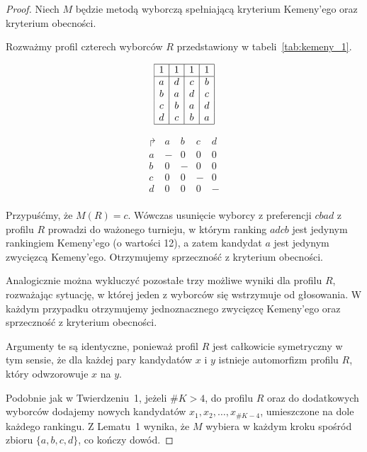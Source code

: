 \documentclass[12pt,a4paper]{mwrep}
\begin{document}
	\begin{proof}
		Niech \(M\) będzie metodą wyborczą spełniającą kryterium Kemeny'ego oraz kryterium obecności.
		
		Rozważmy profil czterech wyborców \(R\) przedstawiony w tabeli~\ref{tab:kemeny_1}.
		
		\begin{table}[H]
			\centering
			\[
			\begin{array}{|c|c|c|c|}
				\hline
				1 & 1 & 1 & 1\\
				\hline
				a & d & c & b\\
				b & a & d & c\\
				c & b & a & d\\
				d & c & b & a\\
				\hline
			\end{array}
			\]
			\caption{Profil preferencji \(R\)}
			\label{tab:kemeny_1}
		\end{table}
	
		\begin{table}[H]
			\centering
			\[
			\begin{array}{c|cccc}
				\Rsh & a & b & c & d\\
				\hline
				a & - & 0 & 0 & 0\\
				b & 0 & - & 0 & 0\\
				c & 0 & 0 & - & 0\\
				d & 0 & 0 & 0 & -\\
			\end{array}
			\]
			\caption{Macierz marginesów większości dla profilu}
			\label{tab:marginesy_kemeny}
		\end{table}
		
		Przypuśćmy, że \(M(R)=c\). Wówczas usunięcie wyborcy z preferencji \(cbad\) z profilu \(R\) prowadzi do ważonego turnieju, w którym ranking \(adcb\) jest jedynym rankingiem Kemeny'ego (o wartości 12), a zatem kandydat \(a\) jest jedynym zwycięzcą Kemeny'ego. Otrzymujemy sprzeczność z kryterium obecności.
		
		Analogicznie można wykluczyć pozostałe trzy możliwe wyniki dla profilu \(R\), rozważając sytuację, w której jeden z wyborców się wstrzymuje od głosowania. W każdym przypadku otrzymujemy jednoznacznego zwycięzcę Kemeny'ego oraz sprzeczność z kryterium obecności.
		
		Argumenty te są identyczne, ponieważ profil \(R\) jest całkowicie symetryczny w tym sensie, że dla każdej pary kandydatów \(x\) i \(y\) istnieje automorfizm profilu \(R\), który odwzorowuje \(x\) na \(y\).
		
		Podobnie jak w Twierdzeniu~1, jeżeli \(\#K > 4\), do profilu \(R\) oraz do dodatkowych wyborców dodajemy nowych kandydatów \(x_1, x_2, \dots, x_{\#K-4}\), umieszczone na dole każdego rankingu. Z Lematu~1 wynika, że \(M\) wybiera w każdym kroku spośród zbioru \(\{a,b,c,d\}\), co kończy dowód.
	\end{proof}
\end{document}
